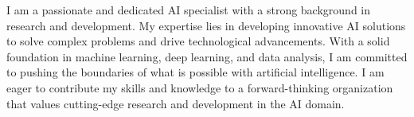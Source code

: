 I am a passionate and dedicated AI specialist with a strong background in research and development. My expertise lies in developing innovative AI solutions to solve complex problems and drive technological advancements. With a solid foundation in machine learning, deep learning, and data analysis, I am committed to pushing the boundaries of what is possible with artificial intelligence. I am eager to contribute my skills and knowledge to a forward-thinking organization that values cutting-edge research and development in the AI domain.